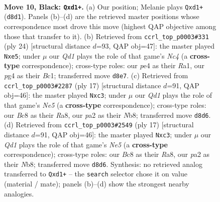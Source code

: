 \documentclass[11pt]{article}
\begin{document}
\clearpage

\begin{figure}[p]\centering
\begin{subfigure}{0.46\textwidth}\centering
\resizebox{\linewidth}{!}{%
\newchessgame
\chessboard[
  setfen={rnbq1rk1/ppp3bp/5pp1/4p3/2P1P1P1/2N2N2/PP2BPP1/1RBQK2R b K - 0 10},
  showmover=false,
  pgfstyle=straightmove, color=movearrow, markmove={d8-d1}
]}
\caption{}
\end{subfigure}\hfill
\begin{subfigure}{0.46\textwidth}\centering
\resizebox{\linewidth}{!}{%
\newchessgame
\chessboard[
  setfen={r2qr1k1/pp2bppp/2p2n2/4n2b/2N1P3/6PP/PPP2PB1/R1B1QRK1 w - - 0 13},
  showmover=false,
  pgfstyle=straightmove, color=movearrow, markmove={c4-e5}
]}
\caption{}
\end{subfigure}
\\[4pt]
\begin{subfigure}{0.46\textwidth}\centering
\resizebox{\linewidth}{!}{%
\newchessgame
\chessboard[
  setfen={rnbqk2r/ppp2pbp/3p4/8/3PnBpP/2NN4/PPP3P1/R2QKB1R b KQkq - 2 9},
  showmover=false,
  pgfstyle=straightmove, color=movearrow, markmove={e4-c3}
]}
\caption{}
\end{subfigure}\hfill
\begin{subfigure}{0.46\textwidth}\centering
\resizebox{\linewidth}{!}{%
\newchessgame
\chessboard[
  setfen={rnbqk2r/ppp2pbp/3p4/8/3PnBpP/2NN4/PPP3P1/R2QKB1R b KQkq - 2 9},
  showmover=false,
  pgfstyle=straightmove, color=movearrow, markmove={e4-c3}
]}
\caption{}
\end{subfigure}
\caption{\textbf{Move 10, Black: \texttt{Qxd1+}.} (a) Our position; Melanie plays \texttt{Qxd1+} (\texttt{d8d1}). Panels (b)--(d) are the retrieved master positions whose correspondence most drove this move (highest QAP objective among those that transfer to it). (b) Retrieved from \texttt{ccrl\_top\_p0003\#331} (ply 24) [structural distance $d$=93, QAP obj=47]: the master played \texttt{Nxe5}; under $\mu$ our \emph{Qd1} plays the role of that game's \emph{Nc4} (a \textbf{cross-type} correspondence); cross-type roles: our \emph{p}e4 as their \emph{R}a1, our \emph{p}g4 as their \emph{B}c1; transferred move \texttt{d8e7}. (c) Retrieved from \texttt{ccrl\_top\_p0003\#2287} (ply 17) [structural distance $d$=91, QAP obj=46]: the master played \texttt{Nxc3}; under $\mu$ our \emph{Qd1} plays the role of that game's \emph{Ne5} (a \textbf{cross-type} correspondence); cross-type roles: our \emph{B}c8 as their \emph{R}a8, our \emph{p}a2 as their \emph{N}b8; transferred move \texttt{d8d6}. (d) Retrieved from \texttt{ccrl\_top\_p0003\#2549} (ply 17) [structural distance $d$=91, QAP obj=46]: the master played \texttt{Nxc3}; under $\mu$ our \emph{Qd1} plays the role of that game's \emph{Ne5} (a \textbf{cross-type} correspondence); cross-type roles: our \emph{B}c8 as their \emph{R}a8, our \emph{p}a2 as their \emph{N}b8; transferred move \texttt{d8d6}. Synthesis: no retrieved analog transferred to \texttt{Qxd1+} -- the \texttt{search} selector chose it on value (material / mate); panels (b)--(d) show the strongest nearby analogies.}
\label{fig:thought-m19}
\end{figure}
\end{document}
